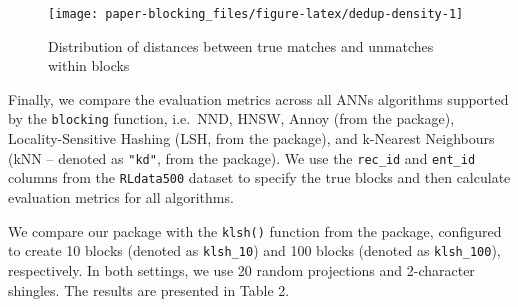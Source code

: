 \begin{figure}[ht!]

{\centering \texttt{[image: paper-blocking\_files/figure-latex/dedup-density-1]}

}

\caption{Distribution of distances between true matches and unmatches within blocks}\label{fig:dedup-density}
\end{figure}

Finally, we compare the evaluation metrics across all ANNs algorithms
supported by the \texttt{blocking} function, i.e.~NND, HNSW, Annoy (from the  package),
Locality-Sensitive Hashing (LSH, from the  package), and
k-Nearest Neighbours (kNN -- denoted as \texttt{"kd"}, from the 
package). We use the \texttt{rec\_id} and \texttt{ent\_id} columns from the \texttt{RLdata500}
dataset to specify the true blocks and then calculate evaluation metrics
for all algorithms.

We compare our package with the \texttt{klsh()}
function from the  package, configured to create 10 blocks (denoted as \texttt{klsh\_10})
and 100 blocks (denoted as \texttt{klsh\_100}), respectively. In both settings, we use 20 random
projections and 2-character shingles. The results are presented in Table 2.

